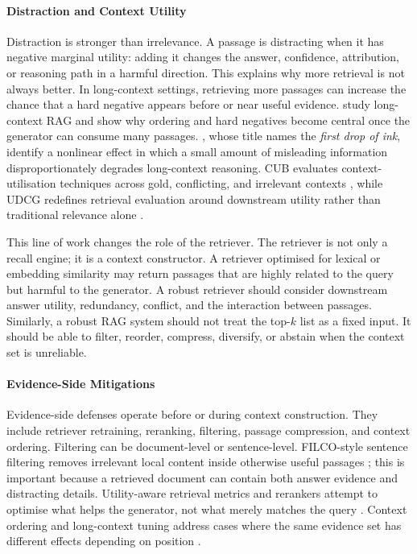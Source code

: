 \paragraph{Distraction and Context Utility}

Distraction is stronger than irrelevance. A passage is distracting when it has negative marginal utility: adding it changes the answer, confidence, attribution, or reasoning path in a harmful direction. This explains why more retrieval is not always better. In long-context settings, retrieving more passages can increase the chance that a hard negative appears before or near useful evidence. \citet{rrag039} study long-context RAG and show why ordering and hard negatives become central once the generator can consume many passages. \citet{rrag003}, whose title names the \emph{first drop of ink}, identify a nonlinear effect in which a small amount of misleading information disproportionately degrades long-context reasoning. CUB evaluates context-utilisation techniques across gold, conflicting, and irrelevant contexts \citep{rrag032}, while UDCG redefines retrieval evaluation around downstream utility rather than traditional relevance alone \citep{rrag058}.

This line of work changes the role of the retriever. The retriever is not only a recall engine; it is a context constructor. A retriever optimised for lexical or embedding similarity may return passages that are highly related to the query but harmful to the generator. A robust retriever should consider downstream answer utility, redundancy, conflict, and the interaction between passages. Similarly, a robust RAG system should not treat the top-$k$ list as a fixed input. It should be able to filter, reorder, compress, diversify, or abstain when the context set is unreliable.

\paragraph{Evidence-Side Mitigations}

Evidence-side defenses operate before or during context construction. They include retriever retraining, reranking, filtering, passage compression, and context ordering. Filtering can be document-level or sentence-level. FILCO-style sentence filtering removes irrelevant local content inside otherwise useful passages \citep{rrag044}; this is important because a retrieved document can contain both answer evidence and distracting details. Utility-aware retrieval metrics and rerankers attempt to optimise what helps the generator, not what merely matches the query \citep{rrag058}. Context ordering and long-context tuning address cases where the same evidence set has different effects depending on position \citep{rrag039}.

